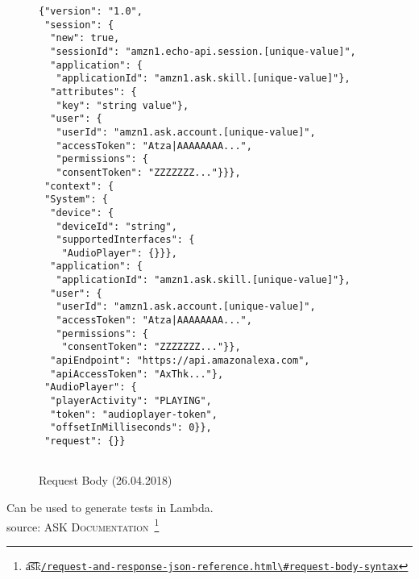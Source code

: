 \begin{figure}[H]
	\caption[HTTPS Request Body Syntax]{Request Body (26.04.2018) }
	\label{jsonFromAlexa}

\begin{verbatim}
{"version": "1.0",
 "session": {
  "new": true,
  "sessionId": "amzn1.echo-api.session.[unique-value]",
  "application": {
   "applicationId": "amzn1.ask.skill.[unique-value]"},
  "attributes": {
   "key": "string value"},
  "user": {
   "userId": "amzn1.ask.account.[unique-value]",
   "accessToken": "Atza|AAAAAAAA...",
   "permissions": {
   "consentToken": "ZZZZZZZ..."}}},
 "context": {
 "System": {
  "device": {
   "deviceId": "string",
   "supportedInterfaces": {
    "AudioPlayer": {}}},
  "application": {
   "applicationId": "amzn1.ask.skill.[unique-value]"},
  "user": {
   "userId": "amzn1.ask.account.[unique-value]",
   "accessToken": "Atza|AAAAAAAA...",
   "permissions": {
    "consentToken": "ZZZZZZZ..."}},
  "apiEndpoint": "https://api.amazonalexa.com",
  "apiAccessToken": "AxThk..."},
 "AudioPlayer": {
  "playerActivity": "PLAYING",
  "token": "audioplayer-token",
  "offsetInMilliseconds": 0}},
 "request": {}}
	
	\end{verbatim}
\end{figure}

Can be used to generate tests in Lambda.\\
source: \textsc{ASK Documentation}~\footnote{\t{a\t{sk}}\href{https://developer.amazon.com/docs/custom-skills}{\lstinline|/request-and-response-json-reference.html\#request-body-syntax|}}




{}
